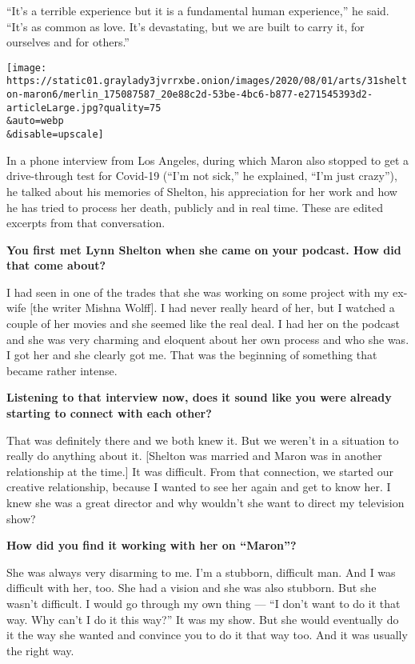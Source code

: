 ``It's a terrible experience but it is a fundamental human experience,''
he said. ``It's as common as love. It's devastating, but we are built to
carry it, for ourselves and for others.''

\texttt{[image: https://static01.graylady3jvrrxbe.onion/images/2020/08/01/arts/31shelton-maron6/merlin\_175087587\_20e88c2d-53be-4bc6-b877-e271545393d2-articleLarge.jpg?quality=75\\\&auto=webp\\\&disable=upscale]}

In a phone interview from Los Angeles, during which Maron also stopped
to get a drive-through test for Covid-19 (``I'm not sick,'' he
explained, ``I'm just crazy''), he talked about his memories of Shelton,
his appreciation for her work and how he has tried to process her death,
publicly and in real time. These are edited excerpts from that
conversation.

\textbf{You first met Lynn Shelton when she came on your podcast. How
did that come about?}

I had seen in one of the trades that she was working on some project
with my ex-wife {[}the writer Mishna Wolff{]}. I had never really heard
of her, but I watched a couple of her movies and she seemed like the
real deal. I had her on the podcast and she was very charming and
eloquent about her own process and who she was. I got her and she
clearly got me. That was the beginning of something that became rather
intense.

\textbf{Listening to that interview now, does it sound like you were
already starting to connect with each other?}

That was definitely there and we both knew it. But we weren't in a
situation to really do anything about it. {[}Shelton was married and
Maron was in another relationship at the time.{]} It was difficult. From
that connection, we started our creative relationship, because I wanted
to see her again and get to know her. I knew she was a great director
and why wouldn't she want to direct my television show?

\textbf{How did you find it working with her on ``Maron''?}

She was always very disarming to me. I'm a stubborn, difficult man. And
I was difficult with her, too. She had a vision and she was also
stubborn. But she wasn't difficult. I would go through my own thing ---
``I don't want to do it that way. Why can't I do it this way?'' It was
my show. But she would eventually do it the way she wanted and convince
you to do it that way too. And it was usually the right way.

